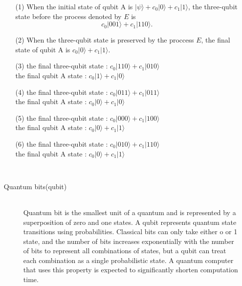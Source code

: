 \documentclass{jarticle}
\newcommand{\qubit}[1]{\vert{#1}\rangle}
\begin{document}
\begin{itemize}
\begin{enumerate}
        \end{enumerate}
    \item[\fbox{$\spadesuit$Q23}] 
        \begin{enumerate}

        \item[(1)] When the initial state of qubit A is $\qubit{\psi}+c_0\qubit{0}+c_1\qubit{1}$, 
            the three-qubit state before the process denoted by $E$ is 
            \begin{equation}
                c_0\qubit{001}+c_1\qubit{110}.
            \end{equation}

        \item[(2)] When the three-qubit state is preserved by the proccess $E$, 
            the final state of qubit A is $c_0\qubit{0}+c_1\qubit{1}$.

        \item[(3)] the final three-qubit state : $c_0\qubit{110}+c_1\qubit{010}$\\
                the final qubit A state : $c_0\qubit{1}+c_1\qubit{0}$

        \item[(4)] the final three-qubit state : $c_0\qubit{011}+c_1\qubit{011}$\\
                the final qubit A state : $c_0\qubit{0}+c_1\qubit{0}$
            
        \item[(5)] the final three-qubit state : $c_0\qubit{000}+c_1\qubit{100}$\\
                the final qubit A state : $c_0\qubit{0}+c_1\qubit{1}$

        \item[(6)] the final three-qubit state : $c_0\qubit{010}+c_1\qubit{110}$\\
                the final qubit A state : $c_0\qubit{0}+c_1\qubit{1}$

        \end{enumerate}
    \item[\fbox{$\spadesuit$Q24}]\mbox{}\\
        \begin{description}

            \item[Quantum bits(qubit)]\mbox{}\\
                Quantum bit is the smallest unit of a quantum and is represented by a superposition of zero and one states.
                A qubit represents quantum state transitions using probabilities.
                Classical bits can only take either o or 1 state, and the number of bits increases exponentially with the number of bits to represent all combinations of states,
                but a qubit can treat each combination as a single probabilistic state.
                A quantum computer that uses this property is expected to significantly shorten computation time.


\end{description}
\end{itemize}
\end{document}
